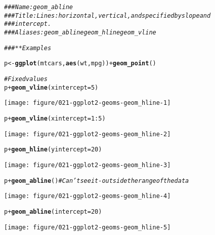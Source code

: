 \documentclass[a4paper,titlepage]{tufte-handout}\usepackage[]{graphicx}\usepackage[]{color}
\makeatletter
\def\maxwidth{ %
  \ifdim\Gin@nat@width>\linewidth
    \linewidth
  \else
    \Gin@nat@width
  \fi
}
\newcommand{\hlnum}[1]{\textcolor[rgb]{0.686,0.059,0.569}{#1}}%
\newcommand{\hlcom}[1]{\textcolor[rgb]{0.678,0.584,0.686}{\textit{#1}}}%
\newcommand{\hlopt}[1]{\textcolor[rgb]{0,0,0}{#1}}%
\newcommand{\hlstd}[1]{\textcolor[rgb]{0.345,0.345,0.345}{#1}}%
\newcommand{\hlkwb}[1]{\textcolor[rgb]{0.69,0.353,0.396}{#1}}%
\newcommand{\hlkwc}[1]{\textcolor[rgb]{0.333,0.667,0.333}{#1}}%
\newcommand{\hlkwd}[1]{\textcolor[rgb]{0.737,0.353,0.396}{\textbf{#1}}}%
\newenvironment{kframe}{%
 \def\at@end@of@kframe{}%
 \ifinner\ifhmode%
  \def\at@end@of@kframe{\end{minipage}}%
  \begin{minipage}{\columnwidth}%
 \fi\fi%
 \def\FrameCommand##1{\hskip\@totalleftmargin \hskip-\fboxsep
 \colorbox{shadecolor}{##1}\hskip-\fboxsep
     \hskip-\linewidth \hskip-\@totalleftmargin \hskip\columnwidth}%
 \MakeFramed {\advance\hsize-\width
   \@totalleftmargin\z@ \linewidth\hsize
   \@setminipage}}%
 {\par\unskip\endMakeFramed%
 \at@end@of@kframe}
\newenvironment{knitrout}{}{} %
\makeatother
\begin{document}
\begin{knitrout}
\color{fgcolor}\begin{kframe}
\begin{alltt}
\hlcom{### Name: geom_abline}
\hlcom{### Title: Lines: horizontal, vertical, and specified by slope and}
\hlcom{###   intercept.}
\hlcom{### Aliases: geom_abline geom_hline geom_vline}

\hlcom{### ** Examples}

\hlstd{p} \hlkwb{<-} \hlkwd{ggplot}\hlstd{(mtcars,} \hlkwd{aes}\hlstd{(wt, mpg))} \hlopt{+} \hlkwd{geom_point}\hlstd{()}

\hlcom{# Fixed values}
\hlstd{p} \hlopt{+} \hlkwd{geom_vline}\hlstd{(}\hlkwc{xintercept} \hlstd{=} \hlnum{5}\hlstd{)}
\end{alltt}
\end{kframe}
\texttt{[image: figure/021-ggplot2-geoms-geom\_hline-1]} 
\begin{kframe}\begin{alltt}
\hlstd{p} \hlopt{+} \hlkwd{geom_vline}\hlstd{(}\hlkwc{xintercept} \hlstd{=} \hlnum{1}\hlopt{:}\hlnum{5}\hlstd{)}
\end{alltt}
\end{kframe}
\texttt{[image: figure/021-ggplot2-geoms-geom\_hline-2]} 
\begin{kframe}\begin{alltt}
\hlstd{p} \hlopt{+} \hlkwd{geom_hline}\hlstd{(}\hlkwc{yintercept} \hlstd{=} \hlnum{20}\hlstd{)}
\end{alltt}
\end{kframe}
\texttt{[image: figure/021-ggplot2-geoms-geom\_hline-3]} 
\begin{kframe}\begin{alltt}
\hlstd{p} \hlopt{+} \hlkwd{geom_abline}\hlstd{()} \hlcom{# Can't see it - outside the range of the data}
\end{alltt}
\end{kframe}
\texttt{[image: figure/021-ggplot2-geoms-geom\_hline-4]} 
\begin{kframe}\begin{alltt}
\hlstd{p} \hlopt{+} \hlkwd{geom_abline}\hlstd{(}\hlkwc{intercept} \hlstd{=} \hlnum{20}\hlstd{)}
\end{alltt}
\end{kframe}
\texttt{[image: figure/021-ggplot2-geoms-geom\_hline-5]} 
\begin{kframe}\begin{alltt}

\end{alltt}
\end{kframe}
\end{knitrout}
\end{document}
